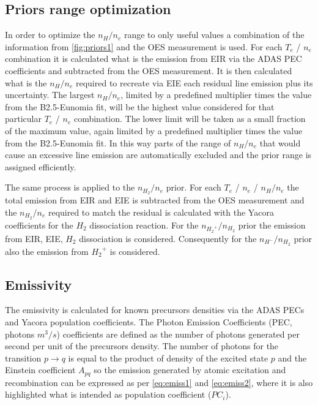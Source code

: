 \subsection{Priors range optimization}\label{Priors range optimization}
In order to optimize the $n_{H}/n_e$ range to only useful values a combination of the information from \autoref{fig:priors1} and the OES measurement is used. For each $T_e$ / $n_e$ combination it is calculated what is the emission from EIR via the ADAS PEC coefficients and subtracted from the OES measurement. It is then calculated what is the $n_{H}/n_e$ required to recreate via EIE each residual line emission plus its uncertainty. The largest $n_{H}/n_e$, limited by a predefined multiplier times the value from the B2.5-Eunomia fit, will be the highest value considered for that particular $T_e$ / $n_e$ combination. The lower limit will be taken as a small fraction of the maximum value, again limited by a predefined multiplier times the value from the B2.5-Eunomia fit. In this way parts of the range of $n_{H}/n_e$ that would cause an excessive line emission are automatically excluded and the prior range is assigned efficiently.

The same process is applied to the $n_{H_2}/n_e$ prior. For each $T_e$ / $n_e$ / $n_{H}/n_e$ the total emission from EIR and EIE is subtracted from the OES measurement and the $n_{H_2}/n_e$ required to match the residual is calculated with the Yacora coefficients for the $H_2$ dissociation reaction. For the $n_{{H_2}^+}/n_{H_2}$ prior the emission from EIR, EIE, $H_2$ dissociation is considered. Consequently for the $n_{{H}^-}/n_{H_2}$ prior also the emission from ${H_2}^+$ is considered.

\subsection{Emissivity}\label{Emissivity}

The emissivity is calculated for known precursors densities via the ADAS PECs and Yacora population coefficients.\cite{Verhaegh2020}
The Photon Emission Coefficients (PEC, photons $m^3/s$) coefficients are defined as the number of photons generated per second per unit of the precursors density. The number of photons for the transition $p \rightarrow q$ is equal to the product of density of the excited state $p$ and the Einstein coefficient $A_{pq}$ so the emission generated by atomic excitation and recombination can be expressed as per \autoref{eq:emiss1} and \ref{eq:emiss2}, where it is also highlighted what is intended as population coefficient ($PC_i$).


